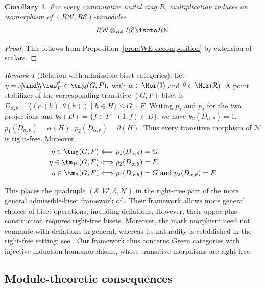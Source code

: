 \documentclass{amsart}
\numberwithin{equation}{section}%
\newtheorem{Cor}[equation]{Corollary}
\theoremstyle{remark}
\newtheorem{Rem}[equation]{Remark}
\theoremstyle{definition}
\newcommand{\lind}[1]{{}_{#1}\!\ind}
\begin{document}
%
\begin{Cor}
\label{cor:WE-decomposition-scalar-extension}
For every commutative unital ring $R$, multiplication induces an
isomorphism of $(R\mathcal W,R\mathcal E)$-bimodules
%
\[
R\mathcal W\otimes_{R\mathcal S}R\mathcal E
\isoto
R\mathcal N.
\]
\end{Cor}
%
\begin{proof}
This follows from
Proposition~\ref{prop:WE-decomposition}
by extension of scalars.
\end{proof}
%
\begin{Rem}[Relation with admissible biset categories]
\label{rem:admissible-biset-categories}
Let
$\eta
=
\lind{G}_H^\alpha\res_F^\theta
\in\tm_{\mathcal N}(G,F),
$
with $\alpha\in\Mor(\mathcal I)$ and
$\theta\in\Mor(\mathcal R)$. A point stabilizer of the corresponding
transitive $(G,F)$-biset is
$D_{\alpha,\theta}
=
\{(\alpha(h),\theta(h))\mid h\in H\}
\leq G\times F$.
Writing $p_1$ and $p_2$ for the two projections and
$k_2(D)
=
\{f\in F\mid (1,f)\in D\}$,
we have
$k_2(D_{\alpha,\theta})=1$,
$p_1(D_{\alpha,\theta})=\alpha(H)$,
$p_2(D_{\alpha,\theta})=\theta(H)$.
Thus every transitive morphism of $\mathcal N$ is right-free.
Moreover,
\[
\begin{aligned}
	\eta\in\tm_{\mathcal E}(G,F)
	&\Longleftrightarrow p_1(D_{\alpha,\theta})=G,\\
	\eta\in\tm_{\mathcal W}(G,F)
	&\Longleftrightarrow p_2(D_{\alpha,\theta})=F,\\
	\eta\in\tm_{\mathcal S}(G,F)
	&\Longleftrightarrow
	p_1(D_{\alpha,\theta})=G
	\text{ and }
	p_2(D_{\alpha,\theta})=F.
\end{aligned}
\]


This places the quadruple
$(\mathcal S,\mathcal W,\mathcal E,\mathcal N)$ in the right-free
part of the more general admissible-biset framework of
\cite{BoltjeRaggiCardenasValeroElizondo19}.
Their framework allows more general choices of biset operations,
including deflations. However, their upper-plus construction
requires right-free bisets. Moreover, the mark morphism need
not commute with deflations in general, whereas its naturality
is established in the right-free setting; see
\cite[Sec.~5 and Thm.~6.1]{BoltjeRaggiCardenasValeroElizondo19}.
Our framework thus concerns Green categories with injective induction 
homomorphisms, whose transitive morphisms are right-free.
\end{Rem}

%
\subsection{Module-theoretic consequences}\
\label{ssec:module-theoretic-consequences}
%
\end{document}
